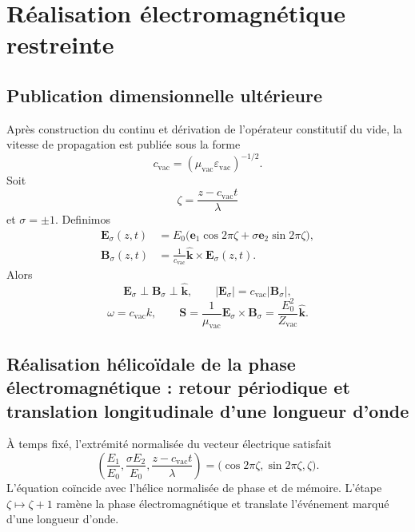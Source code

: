 \chapter{Réalisation électromagnétique restreinte}
\label{espiral:chap:realizacion-em}

\section{Publication dimensionnelle ultérieure}

Après construction du continu et dérivation de l'opérateur constitutif du vide, la vitesse de propagation est publiée sous la forme
\[
 c_{\mathrm{vac}}=(\mu_{\mathrm{vac}}\varepsilon_{\mathrm{vac}})^{-1/2}.
\]
Soit
\[
 \zeta=\frac{z-c_{\mathrm{vac}}t}{\lambda}
\]
et \(\sigma=\pm1\). Definimos
\begin{align}
 \mathbf E_\sigma(z,t)
 &=E_0\bigl(
 \mathbf e_1\cos2\pi\zeta
 +\sigma\mathbf e_2\sin2\pi\zeta\bigr),\\
 \mathbf B_\sigma(z,t)
 &=\frac1{c_{\mathrm{vac}}}\widehat{\mathbf k}
 \times\mathbf E_\sigma(z,t).
 \label{espiral:eq:modo-em-circular}
\end{align}
Alors
\[
 \mathbf E_\sigma\perp\mathbf B_\sigma\perp\widehat{\mathbf k},
 \qquad
 |\mathbf E_\sigma|=c_{\mathrm{vac}}|\mathbf B_\sigma|,
\]
\[
 \omega=c_{\mathrm{vac}}k,
 \qquad
 \mathbf S=\frac1{\mu_{\mathrm{vac}}}
 \mathbf E_\sigma\times\mathbf B_\sigma
 =\frac{E_0^2}{Z_{\mathrm{vac}}}\widehat{\mathbf k}.
\]

\section{Réalisation hélicoïdale de la phase électromagnétique : retour périodique et translation longitudinale d'une longueur d'onde}

À temps fixé, l'extrémité normalisée du vecteur électrique satisfait
\begin{equation}
 \left(
 \frac{E_1}{E_0},\frac{\sigma E_2}{E_0},
 \frac{z-c_{\mathrm{vac}}t}{\lambda}
 \right)
 =\bigl(\cos2\pi\zeta,\sin2\pi\zeta,\zeta\bigr).
 \label{espiral:eq:helice-em-fase-posicion}
\end{equation}
L'équation coïncide avec l'hélice normalisée de phase et de mémoire. L'étape \(\zeta\mapsto\zeta+1\) ramène la phase électromagnétique et translate l'événement marqué d'une longueur d'onde.

